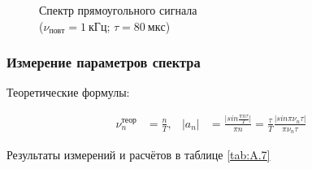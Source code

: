 \documentclass[a4paper, 12pt]{article}
\begin{document}
                \begin{figure}[ht]
                    \centering
                    \begin{minipage}[ht]{0.49\linewidth}
                        \caption{Спектр прямоугольного сигнала\\($\nu_{повт} = 1~кГц$; $\tau = 80~мкс$)}
                        \label{plot:A.6.7}
                    \end{minipage}
                \end{figure}

            \subsubsection{Измерение параметров спектра}

                Теоретические формулы:

                \begin{align*}
                    \nu_n^{теор} &= \frac{n}{T}, & \vert a_n \vert &= \frac{\vert sin\frac{\pi n \tau}{T} \vert}{\pi n} = \frac{\tau}{T} \frac{\vert sin \pi \nu_n \tau \vert}{\pi \nu_n \tau}
                \end{align*}

                Результаты измерений и расчётов в таблице \ref{tab:A.7}
\end{document}
